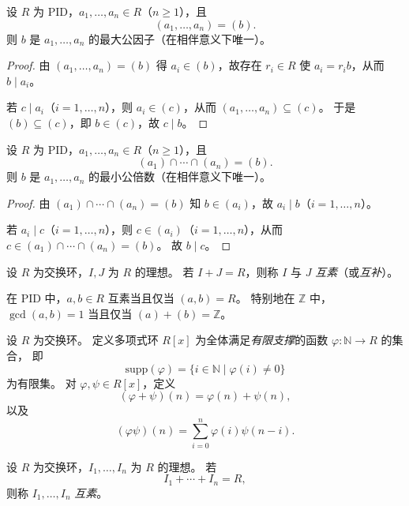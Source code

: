 \documentclass[lang=cn,a4paper,newtx]{elegantbook}
\begin{document}
\begin{proposition}
  设 $R$ 为 PID，$a_1,\dots,a_n\in R$（$n\ge 1$），且
  \[
    (a_1,\dots,a_n)=(b).
  \]
  则 $b$ 是 $a_1,\dots,a_n$ 的最大公因子（在相伴意义下唯一）。
\end{proposition}

\begin{proof}
  由 $(a_1,\dots,a_n)=(b)$ 得 $a_i\in (b)$，故存在 $r_i\in R$ 使 $a_i=r_i b$，从而 $b\mid a_i$。

  若 $c\mid a_i$（$i=1,\dots,n$），则 $a_i\in (c)$，从而 $(a_1,\dots,a_n)\subseteq (c)$。
  于是 $(b)\subseteq (c)$，即 $b\in (c)$，故 $c\mid b$。
\end{proof}

\begin{proposition}
  设 $R$ 为 PID，$a_1,\dots,a_n\in R$（$n\ge 1$），且
  \[
    (a_1)\cap\cdots\cap (a_n)=(b).
  \]
  则 $b$ 是 $a_1,\dots,a_n$ 的最小公倍数（在相伴意义下唯一）。
\end{proposition}

\begin{proof}
  由 $(a_1)\cap\cdots\cap (a_n)=(b)$ 知 $b\in (a_i)$，故 $a_i\mid b$（$i=1,\dots,n$）。

  若 $a_i\mid c$（$i=1,\dots,n$），则 $c\in (a_i)$（$i=1,\dots,n$），从而 $c\in (a_1)\cap\cdots\cap (a_n)=(b)$。
  故 $b\mid c$。
\end{proof}

\begin{definition}
  设 $R$ 为交换环，$I,J$ 为 $R$ 的理想。
  若 $I+J=R$，则称 $I$ 与 $J$ \emph{互素}（或\emph{互补}）。
\end{definition}

\begin{remark}
  在 PID 中，$a,b\in R$ 互素当且仅当 $(a,b)=R$。
  特别地在 $\mathbb{Z}$ 中，$\gcd(a,b)=1$ 当且仅当 $(a)+(b)=\mathbb{Z}$。
\end{remark}

\begin{definition}
  设 $R$ 为交换环。
  定义多项式环 $R[x]$ 为全体满足\emph{有限支撑}的函数 $\varphi:\mathbb{N}\to R$ 的集合，
  即
  \[
    \mathrm{supp}(\varphi)=\{i\in\mathbb{N}\mid \varphi(i)\ne 0\}
  \]
  为有限集。
  对 $\varphi,\psi\in R[x]$，定义
  \[
    (\varphi+\psi)(n)=\varphi(n)+\psi(n),
  \]
  以及
  \[
    (\varphi\psi)(n)=\sum_{i=0}^n \varphi(i)\psi(n-i).
  \]
\end{definition}

\begin{definition}
  设 $R$ 为交换环，$I_1,\dots,I_n$ 为 $R$ 的理想。
  若
  \[
    I_1+\cdots+I_n=R,
  \]
  则称 $I_1,\dots,I_n$ \emph{互素}。
\end{definition}
\end{document}
